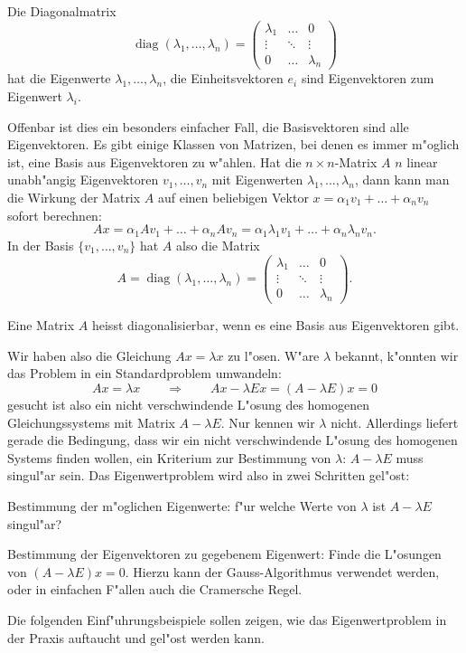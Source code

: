 \begin{hilfssatz}
Die Diagonalmatrix
\[
\operatorname{diag}(\lambda_1,\dots,\lambda_n)
=\begin{pmatrix}
\lambda_1&\dots&0\\
\vdots&\ddots&\vdots\\
0&\dots&\lambda_n
\end{pmatrix}
\]
hat die Eigenwerte $\lambda_1,\dots,\lambda_n$, die Einheitsvektoren
$e_i$ sind Eigenvektoren zum Eigenwert $\lambda_i$.
\end{hilfssatz}
Offenbar ist dies ein besonders einfacher Fall, die Basisvektoren sind
alle Eigenvektoren. Es gibt einige Klassen von Matrizen, bei denen es
immer m"oglich ist, eine Basis aus Eigenvektoren zu w"ahlen. Hat die
$n\times n$-Matrix $A$ $n$ linear unabh"angig Eigenvektoren $v_1,\dots,v_n$
mit Eigenwerten $\lambda_1,\dots,\lambda_n$, dann kann man die Wirkung
der Matrix $A$ auf einen beliebigen Vektor $x=\alpha_1v_1+\dots+\alpha_nv_n$
sofort berechnen:
\[
Ax=\alpha_1Av_1+\dots+\alpha_nAv_n=\alpha_1\lambda_1v_1+\dots+\alpha_n\lambda_nv_n.
\]
In der Basis $\{v_1,\dots,v_n\}$ hat $A$ also die Matrix
\[
A=\operatorname{diag}(\lambda_1,\dots,\lambda_n)
=
\begin{pmatrix}
\lambda_1&\dots&0\\
\vdots&\ddots&\vdots\\
0&\dots&\lambda_n
\end{pmatrix}.
\]
\begin{definition}
Eine Matrix $A$ heisst diagonalisierbar, wenn es eine Basis aus
Eigenvektoren gibt.
\end{definition}

Wir haben also die Gleichung $Ax=\lambda x$ zu l"osen. W"are 
$\lambda$ bekannt, k"onnten wir das Problem in ein Standardproblem
umwandeln:
\[
Ax=\lambda x\qquad\Rightarrow\qquad Ax-\lambda Ex=(A-\lambda E)x=0
\]
gesucht ist also ein nicht verschwindende L"osung des homogenen
Gleichungssystems mit
Matrix $A-\lambda E$. Nur kennen wir $\lambda$ nicht.
Allerdings
liefert gerade die Bedingung, dass wir ein nicht verschwindende
L"osung des homogenen Systems finden wollen, ein Kriterium zur
Bestimmung von $\lambda$: $A-\lambda E$ muss singul"ar sein.
Das Eigenwertproblem wird also in zwei Schritten gel"ost:
\begin{compactenum}
\item Bestimmung der m"oglichen Eigenwerte: f"ur welche Werte von $\lambda$
ist $A-\lambda E$ singul"ar?
\item Bestimmung der Eigenvektoren zu gegebenem Eigenwert: Finde die
L"osungen von $(A-\lambda E)x=0$. Hierzu kann der Gauss-Algorithmus
verwendet werden, oder in einfachen F"allen auch die Cramersche Regel.
\end{compactenum}
Die folgenden Einf"uhrungsbeispiele sollen zeigen, wie das Eigenwertproblem
in der Praxis auftaucht und gel"ost werden kann. 

